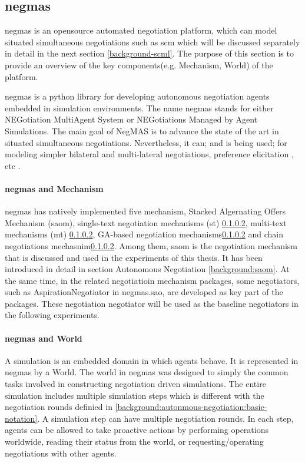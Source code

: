 \subsection{\gls{negmas}} \label{background:negmas}
\gls{negmas} is an opensource automated negotiation platform, which can model situated simultaneous negotiations such as \gls{scm} which will be discussed separately in detail in the next section \ref{background-scml}. The purpose of this section is to provide an overview of the key components(e.g. Mechanism, World) of the platform.

\gls{negmas} is a python library for developing autonomous negotiation agents embedded in simulation environments. The name negmas stands for either NEGotiation MultiAgent System or NEGotiations Managed by Agent Simulations. The main goal of NegMAS is to advance the state of the art in situated simultaneous negotiations. Nevertheless, it can; and is being used; for modeling simpler bilateral and multi-lateral negotiations, preference elicitation , etc \parencite{Mohammad2019}.

\paragraph{\gls{negmas} and Mechanism}
\gls{negmas} has natively implemented five mechanism, Stacked Algernating Offers Mechanism (\gls{saom}), single-text negotiation mechanisms (st) \ref{}, multi-text mechanisms (mt) \ref{}, GA-based negotiation mechanisms\ref{} and chain negotiations mechasnim\ref{}. Among them, \gls{saom} is the negotiation mechanism that is discussed and used in the experiments of this thesis. It has been introduced in detail in section Autonomous Negotiation \ref{background:saom}. At the same time, in the related negotiatioin mechanism packages, some negotiators, such as AspirationNegotiator in negmas.sao, are developed as key part of the packages. These negotiation negotiator will be used as the baseline negotiators in the following experiments.
\paragraph{\gls{negmas} and World}
A simulation is an embedded domain in which agents behave. It is represented in \gls{negmas} by a World. The world in \gls{negmas} was designed to simply the common tasks involved in constructing negotiation driven simulations\parencite{Mohammad2019}. The entire simulation includes multiple simulation steps which is different with the negotiation rounds definied in \ref{background:autonmous-negotiation:basic-notation}. A simulation step can have multiple negotiation rounds. In each step, agents can be allowed to take proactive actions by performing operations worldwide, reading their status from the world, or requesting/operating negotiations with other agents.
